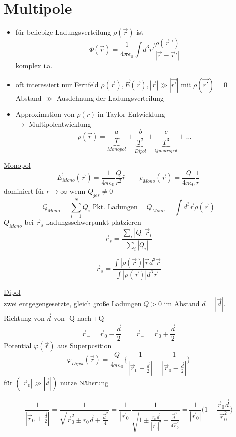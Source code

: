\documentclass[titlepage,12pt,a4paper,ngerman]{report}
\begin{document}
\section{Multipole}
\begin{itemize}
\item für beliebige Ladungsverteilung $\rho(\vec{r})$ ist $$ \Phi (\vec{r}) = \frac{1}{4\pi\epsilon_0} \int d^3 \vec{r'} \frac{\rho(\vec{r}\: ')}{|\vec{r}-\vec{r}'|}$$ komplex i.a.
\item oft interessiert nur Fernfeld $\rho(\vec{r}), \vec{E}(\vec{r}), |\vec{r}| \gg | \vec{r'}|$ mit $\rho(\vec{r'}) = 0$
Abstand $\gg$ Ausdehnung der Ladungsverteilung
\item Approximation von $\rho(r)$ in Taylor-Entwicklung\\
$\rightarrow$ Multipolentwicklung
$$\rho(\vec{r}) = \underbrace{\frac{a}{T}}_{Monopol} + \underbrace{\frac{b}{T^2}}_{Dipol} + \underbrace{\frac{c}{T^3}}_{Quadropol} + \dots$$ 
\end{itemize}
\underline{Monopol}\\
 $$\vec{E}_{Mono}(\vec{r}) = \frac{1}{4\pi\epsilon_0} \frac{Q}{r^2} \hat{r} \qquad \rho_{Mono}(\vec{r}) = \frac{Q}{4\pi\epsilon_0} \frac{1}{r}$$
 dominiert für $r\rightarrow\infty$ wenn $Q_{ges} \neq 0$\\
 $$Q_{Mono} = \sum_{i=1}^N Q_i \textrm{ Pkt. Ladungen } \quad Q_{Mono} = \int d^3\vec{r} \rho (\vec{r})$$
 $Q_{Mono}$ bei $\vec{r}_s$ Ladungsschwerpunkt platzieren\\
 $$\vec{r}_s = \frac{\sum_i |Q_i| \vec{r}_i}{\sum_i | Q_i|}$$
 
 $$\vec{r}_s = \frac{\int|\rho(\vec{r})| \vec{r} d^3 \vec{r}}{\int|\rho(\vec{r})| d^3\vec{r}}$$
 
 
 \underline{Dipol}\\
 zwei entgegengesetzte, gleich große Ladungen $Q>0$ im Abstand $d = |\vec{d}|$. Richtung von $\vec{d}$ von -Q nach +Q 
 $$\vec{r}_- = \vec{r}_0 - \frac{\vec{d}}{2} \qquad \vec{r}_+ = \vec{r}_0 + \frac{\vec{d}}{2}$$
 Potential $\varphi(\vec{r})$ aus Superposition
 $$\varphi_{Dipol} (\vec{r}) = \frac{Q}{4 \pi \epsilon_0} \bigg\{ \frac{1}{|\vec{r}_0 - \frac{\vec{d}}{2}|} - \frac{1}{|\vec{r}_0 - \frac{\vec{d}}{2}|} \bigg\}$$ 
 für $(|\vec{r}_0| \gg |\vec{d}|)$ nutze Näherung 

$$\frac{1}{|\vec{r}_0 \pm \frac{\vec{d}}{2}|} = \frac{1}{\sqrt{\vec{r}_0^2 \pm r_0 \vec{d} + \frac{\vec{d}^2}{4}}} = \frac{1}{|\vec{r}_0|} \frac{1}{\sqrt{1 \pm \frac{r_0 \vec{d}}{|\vec{r}_0|^2} + \frac{\vec{d}^2}{4 \vec{r}_0^2}}} =  \frac{1}{|\vec{r}_0|} \bigg( 1 \mp \frac{\vec{r}_0 \vec{d}}{\vec{r}_0^2}\bigg)$$
 
\end{document}
